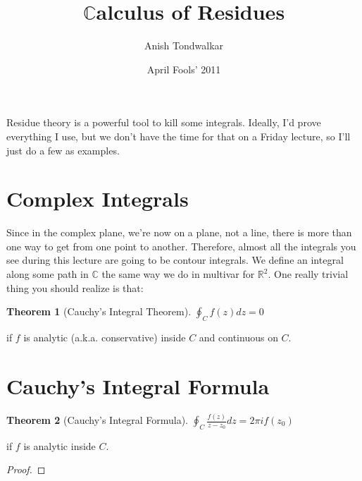 \documentclass[11pt,notitlepage]{article}
\title{$\mathbb{C}$alculus of Residues}
\author{Anish Tondwalkar}
\date{April Fools' 2011}
\newtheorem{thm}{Theorem}[section]
\begin{document}
\maketitle
Residue theory is a powerful tool to kill some integrals. Ideally, I'd prove everything I use, but we don't have the time for that on a Friday lecture, so I'll just do a few as examples. 
\section{Complex Integrals}
Since in the complex plane, we're now on a plane, not a line, there is more than one way to get from one point to another. Therefore, almost all the integrals you see during this lecture are going to be contour integrals. We define an integral along some path in $\mathbb{C}$ the same way we do in multivar for $\mathbb{R}^2$. One really trivial thing you should realize is that:
\begin{thm}[Cauchy's Integral Theorem]
$\oint_C f(z) dz = 0$ 
\end{thm}
\begin{flushright}
if $f$ is analytic (a.k.a.\! conservative) inside $C$ and continuous on $C$.
\end{flushright}
\section{Cauchy's Integral Formula}
\begin{thm}[Cauchy's Integral Formula]
$\oint_C \frac{f(z)}{z-z_0} dz = 2 \pi i f(z_0)$ 
\end{thm}
\begin{flushright}
if $f$ is analytic inside $C$.
\end{flushright}

\begin{proof}

\end{proof}
\end{document}
